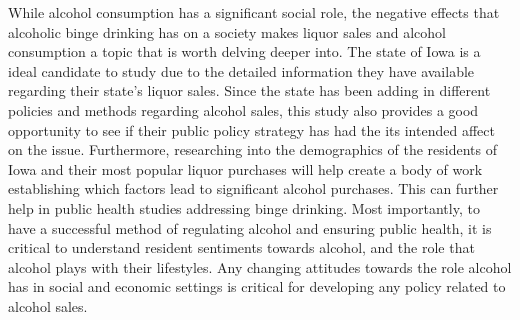 \documentclass{article}
\begin{document}
While alcohol consumption has a significant social role, the negative effects that alcoholic binge drinking has on a society makes liquor sales and alcohol consumption a topic that is worth delving deeper into. The state of Iowa is a ideal candidate to study due to the detailed information they have available regarding their state's liquor sales. Since the state has been adding in different policies and methods regarding alcohol sales, this study also provides a good opportunity to see if their public policy strategy has had the its intended affect on the issue. Furthermore, researching into the  demographics of the residents of Iowa and their most popular liquor purchases will help create a body of work establishing which factors lead to significant alcohol purchases. This can further help in public health studies addressing binge drinking. Most importantly, to have a successful method of regulating alcohol and ensuring public health, it is critical to understand resident sentiments towards alcohol, and the role that alcohol plays with their lifestyles. Any changing attitudes towards the role alcohol has in social and economic settings is critical for developing any policy related to alcohol sales. 
    


\end{document}
